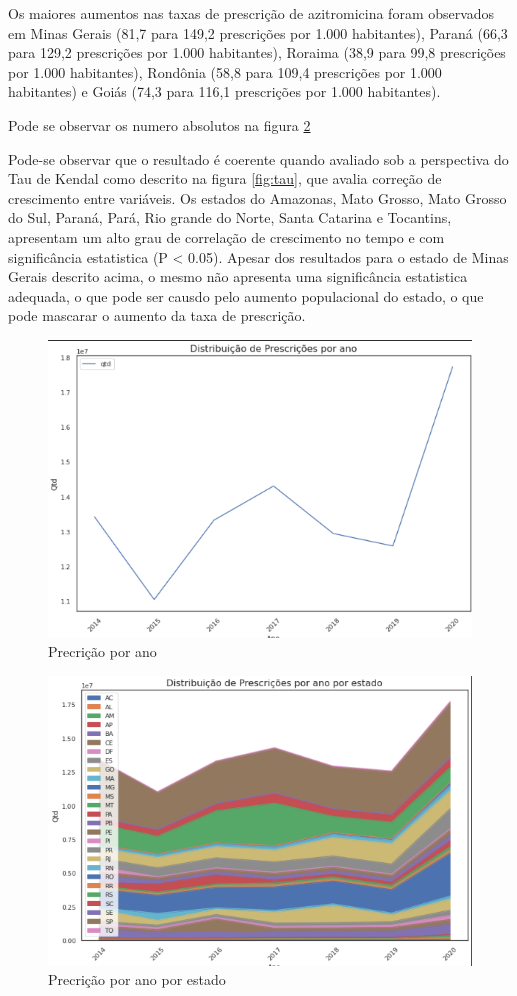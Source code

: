     Os maiores aumentos nas taxas de prescrição de azitromicina foram observados em Minas Gerais (81,7 para 149,2 prescrições por 1.000 habitantes), Paraná (66,3 para 129,2 prescrições por 1.000 habitantes), Roraima (38,9 para 99,8 prescrições por 1.000 habitantes), Rondônia (58,8 para 109,4 prescrições por 1.000 habitantes) e Goiás (74,3 para 116,1 prescrições por 1.000 habitantes). 

    Pode se observar os numero absolutos na figura \ref{fig:presc_ano_estadp}


    Pode-se observar que o resultado é coerente quando avaliado sob a perspectiva do Tau de Kendal como descrito na figura \ref{fig:tau}, que avalia correção de crescimento entre variáveis. Os estados do Amazonas, Mato Grosso, Mato Grosso do Sul, Paraná, Pará, Rio grande do Norte, Santa Catarina e Tocantins, apresentam um alto grau de correlação de crescimento no tempo e com significância estatistica (P < 0.05). Apesar dos resultados para o estado de Minas Gerais descrito acima, o mesmo não apresenta uma significância estatistica adequada, o que pode ser causdo pelo aumento populacional do estado, o que pode mascarar o aumento da taxa de prescrição.
    \begin{figure}[!ht]
        \centering
        \includegraphics[width=0.8\linewidth]{04-figuras/distribuicao_presc_ano.png}
        \caption{Precrição por ano}
        \label{fig:presc_ano}
    \end{figure}
    \begin{figure}[!ht]
        \centering
        \includegraphics[width=0.8\linewidth]{04-figuras/distribuicao_presc_ano_estado.png}
        \caption{Precrição por ano por estado}
        \label{fig:presc_ano_estadp}
    \end{figure}
